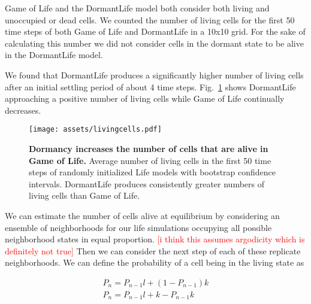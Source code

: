 \documentclass[12pt]{article}
\newcommand{\figref}[1]{Fig.~\ref{fig:#1}}
\newcommand{\note}[1]{\textcolor{red}{[#1]}}
\begin{document}
Game of Life and the DormantLife model both consider both living and unoccupied
or dead cells. We counted the number of living cells for the first 50 time
steps of both Game of Life and DormantLife in a 10x10 grid. For the sake of
calculating this number we did not consider cells in the dormant state to be
alive in the DormantLife model.

We found that DormantLife produces a significantly higher number of living cells
after an initial settling period of about 4 time steps. \figref{living-cells}
shows DormantLife approaching a positive number of living cells while Game of
Life continually decreases.

\begin{figure}
    \centering
    \texttt{[image: assets/livingcells.pdf]}
    \caption{\textbf{Dormancy increases the number of cells that are alive in
    Game of Life.} Average number of living cells in the first 50 time steps of
    randomly initialized Life models with bootstrap confidence intervals.
    DormantLife produces consistently greater numbers of living cells than
    Game of Life.}
    \label{fig:living-cells}
\end{figure}

We can estimate the number of cells alive at equilibrium by considering an
ensemble of neighborhoods for our life simulations occupying all possible
neighborhood states in equal proportion. \note{i think this assumes argodicity
which is definitely not true} Then we can consider the next step of each of
these replicate neighborhoods. We can define the probability of a cell being
in the living state as



\begin{align}
    P_n = P_{n-1}l + (1 - P_{n-1})k\\
    P_n = P_{n-1} l + k - P_{n - 1} k
\end{align}

\printbibliography
\end{document}
